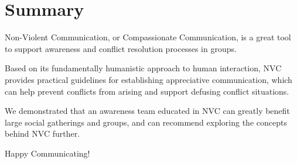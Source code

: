 %
%

\pagebreak
\section{Summary}

\onehalfspacing

Non-Violent Communication, or Compassionate Communication, is a great tool to support awareness and conflict resolution processes in groups.

Based on its fundamentally humanistic approach to human interaction, NVC provides practical guidelines for establishing appreciative communication, which can help prevent conflicts from arising and support defusing conflict situations.

We demonstrated that an awareness team educated in NVC can greatly benefit large social gatherings and groups, and can recommend exploring the concepts behind NVC further.

Happy Communicating!
